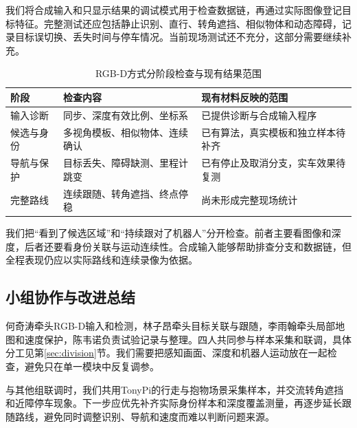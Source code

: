 我们将合成输入和只显示结果的调试模式用于检查数据链，再通过实际图像登记目标特征。完整测试还应包括静止识别、直行、转角遮挡、相似物体和动态障碍，记录目标误切换、丢失时间与停车情况。当前现场测试还不充分，这部分需要继续补充。


\begin{table}[H]\centering\small
\caption{RGB-D方式分阶段检查与现有结果范围}
\begin{tabularx}{\linewidth}{p{32mm}YY}\toprule
阶段 & 检查内容 & 现有材料反映的范围\\\midrule
输入诊断 & 同步、深度有效比例、坐标系 & 已提供诊断与合成输入程序\\
候选与身份 & 多视角模板、相似物体、连续确认 & 已有算法，真实模板和独立样本待补齐\\
导航与保护 & 目标丢失、障碍缺测、里程计跳变 & 已有停止及取消分支，实车效果待复测\\
完整路线 & 连续跟随、转角遮挡、终点停稳 & 尚未形成完整现场统计\\\bottomrule
\end{tabularx}\end{table}
我们把“看到了候选区域”和“持续跟对了机器人”分开检查。前者主要看图像和深度，后者还要看身份关联与运动连续性。合成输入能够帮助排查分支和数据链，但全程表现仍应以实际路线和连续录像为依据。

\subsection{小组协作与改进总结}
何奇涛牵头RGB-D输入和检测，林子昂牵头目标关联与跟随，李雨翰牵头局部地图和速度保护，陈韦诺负责试验记录与整理。四人共同参与样本采集和联调，具体分工见第\ref{sec:division}节。我们需要把感知画面、深度和机器人运动放在一起检查，避免只在单一模块中反复调参。


与其他组联调时，我们共用TonyPi的行走与抱物场景采集样本，并交流转角遮挡和近障停车现象。下一步应优先补齐实际身份样本和深度覆盖测量，再逐步延长跟随路线，避免同时调整识别、导航和速度而难以判断问题来源。
